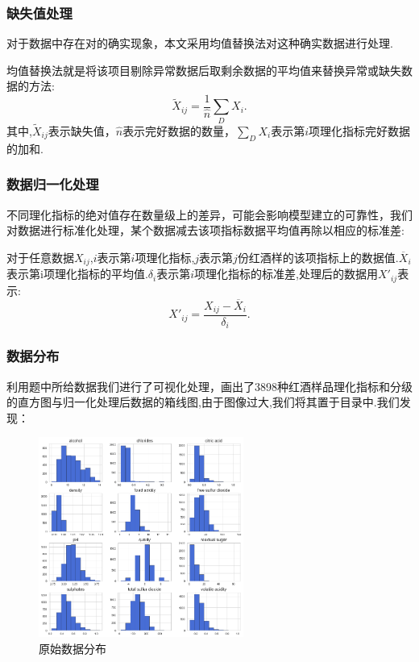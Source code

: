 \documentclass{whutmod}
\begin{document}
\subsubsection{缺失值处理}
对于数据中存在对的确实现象，本文采用均值替换法对这种确实数据进行处理.

均值替换法就是将该项目剔除异常数据后取剩余数据的平均值来替换异常或缺失数据的方法:
\begin{equation}
\widetilde X_{ij}=\frac{1}{\hat n }\sum_{D}X_{i}.
\end{equation}
其中,$\widetilde X_{ij}$表示缺失值，$\hat n$表示完好数据的数量，$\sum_{D}X_{i}$表示第$i$项理化指标完好数据的加和.

\subsubsection{数据归一化处理}
不同理化指标的绝对值存在数量级上的差异，可能会影响模型建立的可靠性，我们对数据进行标准化处理，某个数据减去该项指标数据平均值再除以相应的标准差:

对于任意数据$X_{ij}$,$i$表示第$i$项理化指标,$j$表示第$j$份红酒样的该项指标上的数据值.$\overline X_{i}$表示第{i}项理化指标的平均值.$\delta_{i}$表示第$i$项理化指标的标准差,处理后的数据用$X'_{ij}$表示:
\begin{equation}
X'_{ij}=\frac{X_{ij}-\overline X_{i}}{\delta_{i}}.
\end{equation}

\subsubsection{数据分布}
利用题中所给数据我们进行了可视化处理，画出了3898种红酒样品理化指标和分级的直方图与归一化处理后数据的箱线图,由于图像过大,我们将其置于目录中.我们发现：
\begin{figure}[!htbp]
	\centering
	\includegraphics[width=0.6\textwidth]{fenbu.png}
	\caption{原始数据分布}
\end{figure} 
\end{document}
